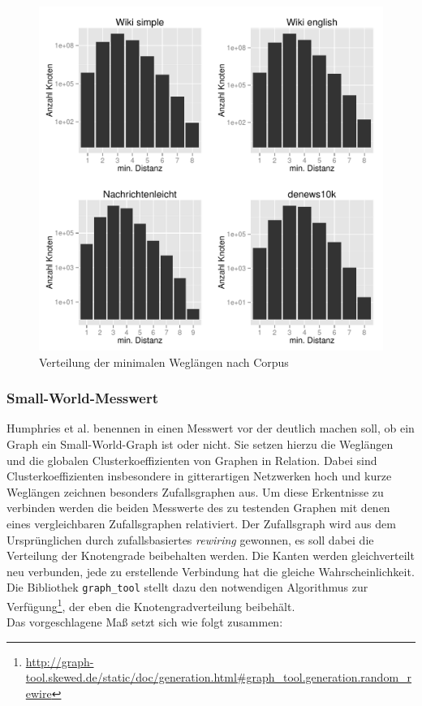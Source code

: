 \documentclass[11pt, a4paper]{article}
\begin{document}
\begin{figure}[ht]
    \centering
        \includegraphics[scale=.75]{mdh_plots.pdf}
    \caption{Verteilung der minimalen Weglängen nach Corpus}
    \label{fig-mdh}
\end{figure}


\subsubsection{Small-World-Messwert}
Humphries et al. benennen in \cite{Humphries2006} einen Messwert vor der deutlich
machen soll, ob ein Graph ein Small-World-Graph ist oder nicht. Sie setzen hierzu
die Weglängen und die globalen Clusterkoeffizienten von Graphen in Relation. 
Dabei sind Clusterkoeffizienten insbesondere in gitterartigen Netzwerken hoch und
kurze Weglängen zeichnen besonders Zufallsgraphen aus. Um diese Erkentnisse zu
verbinden werden die beiden Messwerte des zu testenden Graphen mit denen eines
vergleichbaren Zufallsgraphen relativiert. Der Zufallsgraph wird aus dem 
Ursprünglichen durch zufallsbasiertes \emph{rewiring} gewonnen, es soll dabei die
Verteilung der Knotengrade beibehalten werden. Die Kanten werden gleichverteilt
neu verbunden, jede zu erstellende Verbindung hat die gleiche Wahrscheinlichkeit.
Die Bibliothek \texttt{graph\_tool} stellt dazu den notwendigen Algorithmus zur 
Verfügung\footnote{\url{http://graph-tool.skewed.de/static/doc/generation.html\#graph_tool.generation.random_rewire}},
der eben die Knotengradverteilung beibehält.\\
Das vorgeschlagene Maß setzt sich wie folgt zusammen:
\end{document}
